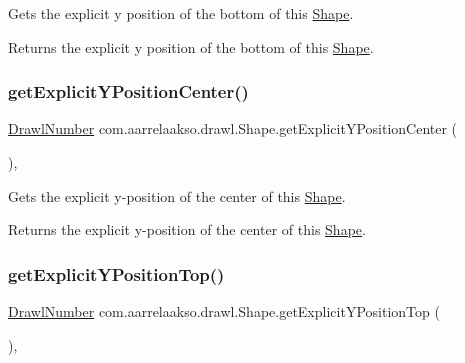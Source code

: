 Gets the explicit y position of the bottom of this \hyperlink{classcom_1_1aarrelaakso_1_1drawl_1_1_shape}{Shape}. 

\begin{DoxyReturn}{Returns}
the explicit y position of the bottom of this \hyperlink{classcom_1_1aarrelaakso_1_1drawl_1_1_shape}{Shape}. 
\end{DoxyReturn}
\mbox{\label{classcom_1_1aarrelaakso_1_1drawl_1_1_shape_a602cb73f783f2856fa81e82bf7792263}} 
\subsubsection{\texorpdfstring{get\+Explicit\+Y\+Position\+Center()}{getExplicitYPositionCenter()}}
{\footnotesize\ttfamily \hyperlink{classcom_1_1aarrelaakso_1_1drawl_1_1_drawl_number}{Drawl\+Number} com.\+aarrelaakso.\+drawl.\+Shape.\+get\+Explicit\+Y\+Position\+Center (\begin{DoxyParamCaption}{ }\end{DoxyParamCaption})\hspace{0.3cm}{\ttfamily [protected]}, {\ttfamily [inherited]}}



Gets the explicit y-\/position of the center of this \hyperlink{classcom_1_1aarrelaakso_1_1drawl_1_1_shape}{Shape}. 

\begin{DoxyReturn}{Returns}
the explicit y-\/position of the center of this \hyperlink{classcom_1_1aarrelaakso_1_1drawl_1_1_shape}{Shape}. 
\end{DoxyReturn}
\mbox{\label{classcom_1_1aarrelaakso_1_1drawl_1_1_shape_a95f8a2f107299d91813627a95b3e0f0f}} 
\subsubsection{\texorpdfstring{get\+Explicit\+Y\+Position\+Top()}{getExplicitYPositionTop()}}
{\footnotesize\ttfamily \hyperlink{classcom_1_1aarrelaakso_1_1drawl_1_1_drawl_number}{Drawl\+Number} com.\+aarrelaakso.\+drawl.\+Shape.\+get\+Explicit\+Y\+Position\+Top (\begin{DoxyParamCaption}{ }\end{DoxyParamCaption})\hspace{0.3cm}{\ttfamily [protected]}, {\ttfamily [inherited]}}



